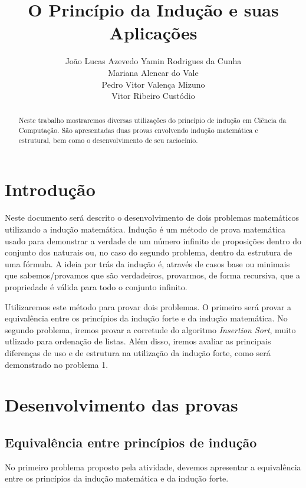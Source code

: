 \documentclass[a4paper, 10pt]{article}
\title{\LARGE \bf
O Princípio da Indução e suas Aplicações
}
\author{João Lucas Azevedo Yamin Rodrigues da Cunha \\
		Mariana Alencar do Vale \\
        Pedro Vitor Valença Mizuno \\
        Vitor Ribeiro Custódio}
\begin{document}
\maketitle

\begin{abstract}

Neste trabalho mostraremos diversas utilizações do princípio de indução em Ciência da Computação. São apresentadas duas provas envolvendo indução matemática e estrutural, bem como o desenvolvimento de seu raciocínio.\par

\end{abstract}

\section{Introdução}

Neste documento será descrito o desenvolvimento de dois problemas matemáticos utilizando a indução matemática. Indução é um método de prova matemática usado para demonstrar a verdade de um número infinito de proposições dentro do conjunto dos naturais ou, no caso do segundo problema, dentro da estrutura de uma fórmula. A ideia por trás da indução é, através de casos base ou minimais que sabemos/provamos que são verdadeiros, provarmos, de forma recursiva, que a propriedade é válida para todo o conjunto infinito. 

Utilizaremos este método para provar dois problemas. O primeiro será provar a equivalência entre os princípios da indução forte e da indução matemática. No segundo problema, iremos provar a corretude do algoritmo \textit{Insertion Sort}, muito utlizado para ordenação de listas. Além disso, iremos avaliar as principais diferenças de uso e de estrutura na utilização da indução forte, como será demonstrado no problema 1.

\section{Desenvolvimento das provas}

\subsection{Equivalência entre princípios de indução}


 No primeiro problema proposto pela atividade, devemos apresentar a equivalência entre os princípios da indução matemática e da indução forte. \par \vspace{5mm}
\end{document}
